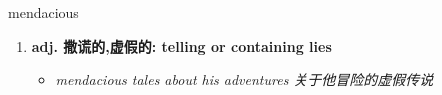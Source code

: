 
\begin{frame}
{\huge mendacious}
\begin{center}
\begin{enumerate}\Large
  \item \textbf{adj. 撒谎的,虚假的: telling or containing lies}
  \begin{itemize}
    \item \em{\Large{mendacious tales about his adventures 关于他冒险的虚假传说}}
  \end{itemize}
\end{enumerate}
\end{center}
\end{frame}
